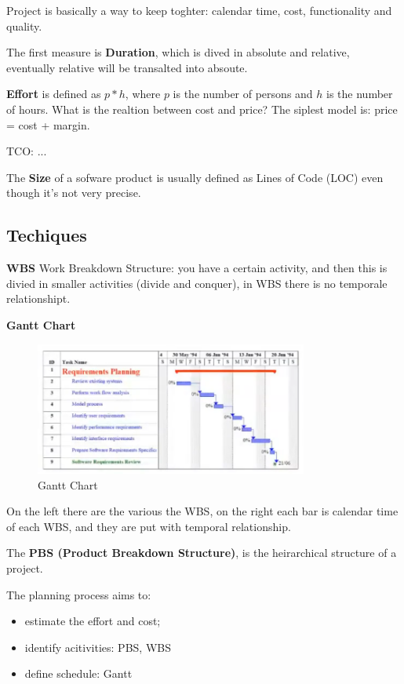 \documentclass[12pt]{article}
\begin{document}
Project is basically a way to keep toghter: calendar time, cost, functionality and quality.

The first measure is \textbf{Duration}, which is dived in absolute and relative, eventually relative will be transalted into absoute.

\textbf{Effort} is defined as $p * h$, where $p$ is the number of persons and $h$ is the number of hours. 
What is the realtion between cost and price? The siplest model is: price = cost + margin.

TCO: ...

The \textbf{Size} of a sofware product is usually defined as Lines of Code (LOC) even though it's not very precise.




\subsection{Techiques}
\textbf{WBS} Work Breakdown Structure: you have a certain activity, and then this is divied in smaller activities (divide and conquer), in WBS there is no temporale relationshipt.

\textbf{Gantt Chart}
\begin{figure}[H]
  \centering
  \includegraphics[width=0.8\textwidth]{gantt-chart.png}
  \caption{Gantt Chart}
  \label{fig:gantt-chart}
\end{figure}
On the left there are the various the WBS, on the right each bar is calendar time of each WBS, and they are put with temporal relationship.

The \textbf{PBS (Product Breakdown Structure)}, is the heirarchical structure of a project.

The planning process aims to:
\begin{itemize}
  \item estimate the effort and cost;
  \item identify acitivities: PBS, WBS
  \item define schedule: Gantt
\end{itemize}
\end{document}
